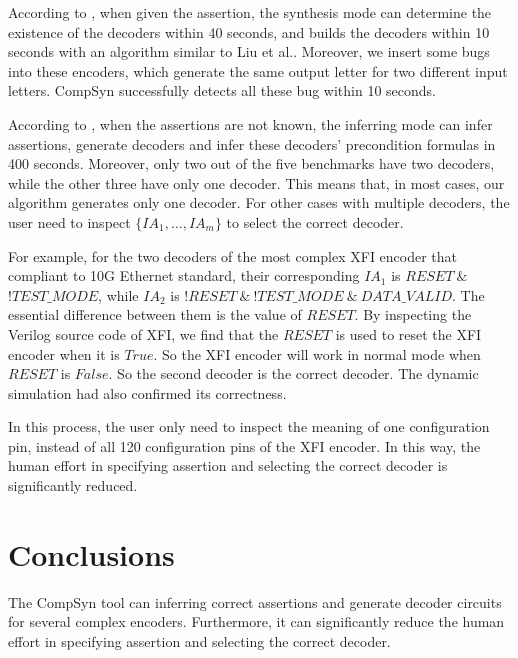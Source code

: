 \documentclass[runningheads,a4paper]{llncs}
\begin{document}
According to \cite{ShengYuShen:tcad11},
when given the assertion,
the synthesis mode can determine the existence of the decoders within 40 seconds,
and builds the decoders within 10 seconds with an algorithm similar to Liu et al.\cite{Roland:iccad11}.
Moreover,
we insert some bugs into these encoders,
which generate the same output letter for two different input letters.
CompSyn successfully detects all these bug within 10 seconds.

According to \cite{ShengYuShen:iccad11,ShengYuShen:tcad12},
when the assertions are not known,
the inferring mode can infer assertions, generate decoders and infer these decoders' precondition formulas in 400 seconds.
Moreover,
only two out of the five benchmarks have two decoders,
while the other three have only one decoder.
This means that,
in most cases,
our algorithm generates only one decoder.
For other cases with multiple decoders,
the user need to inspect $\{IA_1,\dots,IA_{m}\}$ to select the correct decoder.

For example,
for the two decoders of the most complex XFI encoder that compliant to 10G Ethernet standard\cite{IEEE80232002},
their corresponding $IA_1$ is $RESET~\&$ $!TEST\_MODE$,
while $IA_2$ is $!RESET~\&~!TEST\_MODE~\&~DATA\_VALID$.
The essential difference between them is the value of $RESET$.
By inspecting the Verilog source code of XFI,
we find that the $RESET$ is used to reset the XFI encoder when it is $True$.
So the XFI encoder will work in normal mode when $RESET$ is $False$.
So the second decoder is the correct decoder.
The dynamic simulation had also confirmed its correctness.

In this process,
the user only need to inspect the meaning of one configuration pin,
instead of all 120 configuration pins of the XFI encoder.
In this way,
the human effort in specifying assertion and selecting the correct decoder is significantly reduced.

\section{Conclusions}\label{sec_conclude}
The CompSyn tool can inferring correct assertions and generate decoder circuits for several complex encoders.
Furthermore,
it can significantly reduce the human effort in specifying assertion and selecting the correct decoder.


\end{document}
